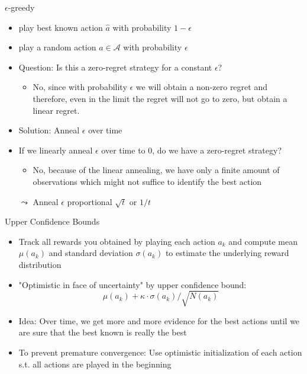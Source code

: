 \documentclass[aspectratio=169]{../latex_main/tntbeamer}  %
\begin{document}
\begin{frame}[c]{$\epsilon$-greedy}
	
	\begin{itemize}
		\item play best known action $\hat{a}$ with probability $1-\epsilon$
		\item play a random action $a \in \mathcal{A}$ with probability $\epsilon$ 
		\smallskip
		\item Question: Is this a zero-regret strategy for a constant $\epsilon$?
		\pause
		\begin{itemize}
			\item No, since with probability $\epsilon$ we will obtain a non-zero regret and therefore, even in the limit the regret will not go to zero, but obtain a linear regret.
		\end{itemize}
		\smallskip\pause
		\item Solution: Anneal $\epsilon$ over time
		\item If we linearly anneal $\epsilon$ over time to $0$, do we have a zero-regret strategy?
		\pause
		\begin{itemize}
			\item No, because of the linear annealing, we have only a finite amount of observations which might not suffice to identify the best action
		\end{itemize}
		\smallskip
		\item[$\leadsto$] Anneal $\epsilon$ proportional $\sqrt{t}$ or $1/t$
	\end{itemize}
	
\end{frame}
\begin{frame}[c]{Upper Confidence Bounds}
	
	\begin{itemize}
		\item Track all rewards you obtained by playing each action $a_k$ and compute mean $\mu(a_k)$ and standard deviation $\sigma(a_k)$ to estimate the underlying reward distribution
		\item "Optimistic in face of uncertainty" by upper confidence bound:
		$$\mu(a_k) + \kappa \cdot \sigma(a_k) / \sqrt{N(a_k)}$$
		\item Idea: Over time, we get more and more evidence for the best actions until we are sure that the best known is really the best
		\medskip
		\pause
		\item To prevent premature convergence: Use optimistic initialization of each action\\ s.t. all actions are played in the beginning
	\end{itemize}
	
\end{frame}
\end{document}
